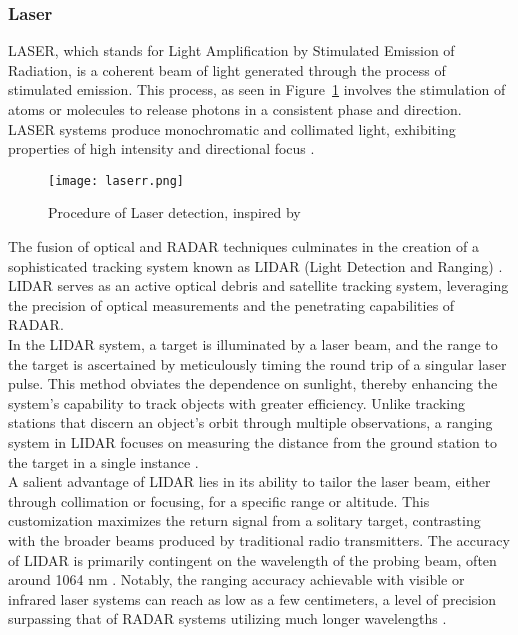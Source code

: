 \subsubsection{Laser}

LASER, which stands for Light Amplification by Stimulated Emission of Radiation, is a coherent beam of light generated through the process of stimulated emission. This process, as seen in Figure~\ref{fig:lsr} involves the stimulation of atoms or molecules to release photons in a consistent phase and direction. LASER systems produce monochromatic and collimated light, exhibiting properties of high intensity and directional focus \cite{laser}.\\
\begin{figure}[h!]
	\centering
	\texttt{[image: laserr.png]}
	\caption{Procedure of Laser detection, inspired by \cite{paul, optical}}\label{fig:lsr}
\end{figure}
The fusion of optical and RADAR techniques culminates in the creation of a sophisticated tracking system known as LIDAR (Light Detection and Ranging) \cite{lidar}. LIDAR serves as an active optical debris and satellite tracking system, leveraging the precision of optical measurements and the penetrating capabilities of RADAR.\\

In the LIDAR system, a target is illuminated by a laser beam, and the range to the target is ascertained by meticulously timing the round trip of a singular laser pulse. This method obviates the dependence on sunlight, thereby enhancing the system's capability to track objects with greater efficiency. Unlike tracking stations that discern an object's orbit through multiple observations, a ranging system in LIDAR focuses on measuring the distance from the ground station to the target in a single instance \cite{optical}.\\

A salient advantage of LIDAR lies in its ability to tailor the laser beam, either through collimation or focusing, for a specific range or altitude. This customization maximizes the return signal from a solitary target, contrasting with the broader beams produced by traditional radio transmitters. The accuracy of LIDAR is primarily contingent on the wavelength of the probing beam, often around 1064 nm \cite{optical}. Notably, the ranging accuracy achievable with visible or infrared laser systems can reach as low as a few centimeters, a level of precision surpassing that of RADAR systems utilizing much longer wavelengths \cite{optical}.\\

